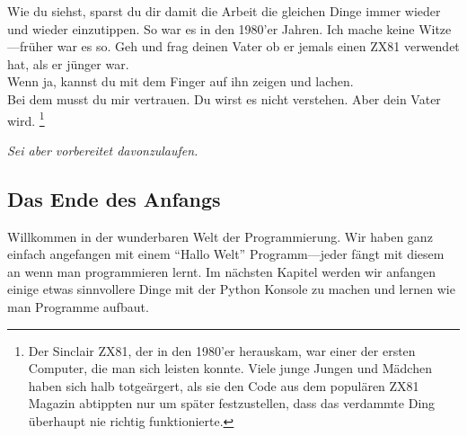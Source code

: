 Wie du siehst, sparst du dir damit die Arbeit die gleichen Dinge immer wieder und wieder einzutippen. So war es in den 1980'er Jahren. Ich mache keine Witze---früher war es so. Geh und frag deinen Vater ob er jemals einen ZX81 verwendet hat, als er jünger war.\\

\noindent
Wenn ja, kannst du mit dem Finger auf ihn zeigen und lachen.\\

\noindent
Bei dem musst du mir vertrauen. Du wirst es nicht verstehen. Aber dein Vater wird. \footnote{Der Sinclair ZX81, der in den 1980'er herauskam, war einer der ersten Computer, die man sich leisten konnte. Viele junge Jungen und Mädchen haben sich halb totgeärgert, als sie den Code aus dem populären ZX81 Magazin abtippten nur um später festzustellen, dass das verdammte Ding überhaupt nie richtig funktionierte.}


\noindent
\emph{Sei aber vorbereitet davonzulaufen.}

\subsection*{\color{BrickRed}Das Ende des Anfangs}

Willkommen in der wunderbaren Welt der Programmierung. Wir haben ganz einfach angefangen mit einem ``Hallo Welt'' Programm---jeder fängt mit diesem an wenn man programmieren lernt.
Im nächsten Kapitel werden wir anfangen einige etwas sinnvollere Dinge mit der Python Konsole zu machen und lernen wie man Programme aufbaut.

\newpage
